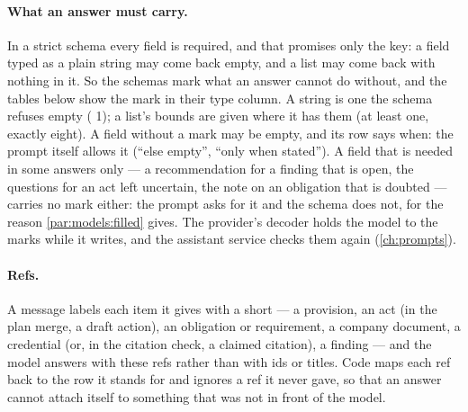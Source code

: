 \paragraph{What an answer must carry.} In a strict schema every field is required, and that
promises only the key: a field typed as a plain string may come back empty, and a list may
come back with nothing in it. So the schemas mark what an answer cannot do without, and the
tables below show the mark in their type column. A  string is one the schema
refuses empty ( 1); a list's bounds are given where it has them (at least
one, exactly eight). A field without a mark may be empty, and its row says when: the prompt
itself allows it (\enquote{else empty}, \enquote{only when stated}). A field that is needed
in some answers only --- a recommendation for a finding that is open, the questions for an
act left uncertain, the note on an obligation that is doubted --- carries no mark either: the
prompt asks for it and the schema does not, for the reason \cref{par:models:filled} gives.
The provider's decoder holds the model to the marks while it writes,
and the assistant service checks them again (\cref{ch:prompts}).

\paragraph{Refs.} A message labels each item it gives with a short  ---  a
provision,  an act (in the plan merge, a draft action),  an obligation or requirement,  a company
document,  a credential (or, in the citation check, a claimed citation),  a
finding --- and the model answers with these refs rather than with ids or titles. Code maps
each ref back to the row it stands for and ignores a ref it never gave, so that an answer
cannot attach itself to something that was not in front of the model.

